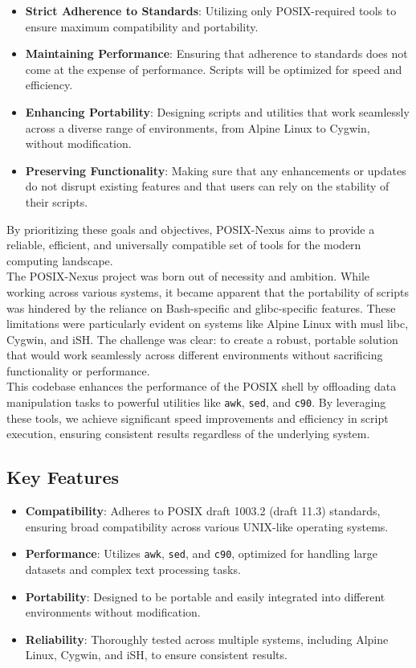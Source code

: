 \begin{itemize} 
    \item \textbf{Strict Adherence to Standards}: Utilizing only POSIX-required tools to ensure maximum compatibility and portability. 
    \item \textbf{Maintaining Performance}: Ensuring that adherence to standards does not come at the expense of performance. Scripts will be optimized for speed and efficiency. 
    \item \textbf{Enhancing Portability}: Designing scripts and utilities that work seamlessly across a diverse range of environments, from Alpine Linux to Cygwin, without modification. 
    \item \textbf{Preserving Functionality}: Making sure that any enhancements or updates do not disrupt existing features and that users can rely on the stability of their scripts. 
\end{itemize}

By prioritizing these goals and objectives, POSIX-Nexus aims to provide a reliable, efficient, and universally compatible set of tools for the modern computing landscape.
\\
The POSIX-Nexus project was born out of necessity and ambition. While working across various systems, it became apparent that the portability of scripts was hindered by the reliance on Bash-specific and glibc-specific features. These limitations were particularly evident on systems like Alpine Linux with musl libc, Cygwin, and iSH. The challenge was clear: to create a robust, portable solution that would work seamlessly across different environments without sacrificing functionality or performance.
\\

This codebase enhances the performance of the POSIX shell by offloading data manipulation tasks to powerful utilities like \texttt{awk}, \texttt{sed}, and \texttt{c90}. By leveraging these tools, we achieve significant speed improvements and efficiency in script execution, ensuring consistent results regardless of the underlying system.

\subsection{Key Features}
\begin{itemize}
    \item \textbf{Compatibility}: Adheres to POSIX draft 1003.2 (draft 11.3) standards, ensuring broad compatibility across various UNIX-like operating systems.
    \item \textbf{Performance}: Utilizes \texttt{awk}, \texttt{sed}, and \texttt{c90}, optimized for handling large datasets and complex text processing tasks.
    \item \textbf{Portability}: Designed to be portable and easily integrated into different environments without modification.
    \item \textbf{Reliability}: Thoroughly tested across multiple systems, including Alpine Linux, Cygwin, and iSH, to ensure consistent results.
\end{itemize}

